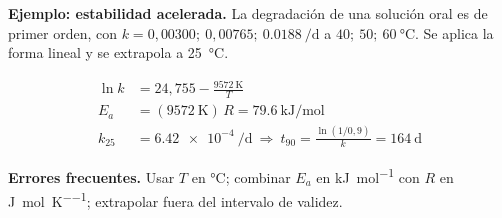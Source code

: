 \documentclass[10pt,letterpaper]{article}
\begin{document}
\vspace{2pt}
\begin{minipage}[t]{0.49\linewidth}\vspace{0pt}\small\raggedright
\textbf{Ejemplo: estabilidad acelerada.} La degradación de una solución oral es de primer orden, con $k=0{,}00300;\ 0{,}00765;\ \SI{0,0188}{\per\day}$ a $40;\ 50;\ \SI{60}{\celsius}$. Se aplica la forma lineal y se extrapola a \SI{25}{\celsius}.
\end{minipage}\hfill
\begin{minipage}[t]{0.47\linewidth}\vspace{-4pt}\small
\begin{align*}
\ln k&=24{,}755-\frac{\SI{9572}{\kelvin}}{T}\\
E_a&=(\SI{9572}{\kelvin})\,R=\SI{79,6}{\kilo\joule\per\mole}\\
k_{25}&=\SI{6,42e-4}{\per\day}\ \Rightarrow\ t_{90}=\frac{\ln(1/0{,}9)}{k}=\SI{164}{\day}
\end{align*}
\vspace{-8pt}
\end{minipage}

\begin{alerta}\small
\textbf{Errores frecuentes.} Usar $T$ en \si{\celsius}; combinar $E_a$ en \si{\kilo\joule\per\mole} con $R$ en \si{\joule\per\mole\per\kelvin}; extrapolar fuera del intervalo de validez.
\end{alerta}
\end{document}
